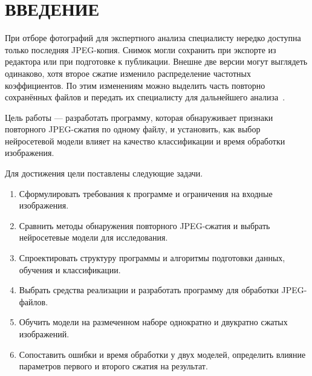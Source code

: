 \chapter*{ВВЕДЕНИЕ}

При отборе фотографий для экспертного анализа специалисту нередко доступна только последняя JPEG-копия. Снимок могли сохранить при экспорте из редактора или при подготовке к публикации. Внешне две версии могут выглядеть одинаково, хотя второе сжатие изменило распределение частотных коэффициентов. По этим изменениям можно выделить часть повторно сохранённых файлов и передать их специалисту для дальнейшего анализа~\cite{wang2016,park2018}.

Цель работы --- разработать программу, которая обнаруживает признаки повторного JPEG-сжатия по одному файлу, и установить, как выбор нейросетевой модели влияет на качество классификации и время обработки изображения.

Для достижения цели поставлены следующие задачи.
\begin{enumerate}
  \item Сформулировать требования к программе и ограничения на входные изображения.
  \item Сравнить методы обнаружения повторного JPEG-сжатия и выбрать нейросетевые модели для исследования.
  \item Спроектировать структуру программы и алгоритмы подготовки данных, обучения и классификации.
  \item Выбрать средства реализации и разработать программу для обработки JPEG-файлов.
  \item Обучить модели на размеченном наборе однократно и двукратно сжатых изображений.
  \item Сопоставить ошибки и время обработки у двух моделей, определить влияние параметров первого и второго сжатия на результат.
\end{enumerate}
